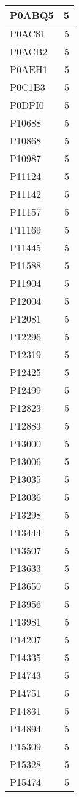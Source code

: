 \documentclass[
]{book}
\theoremstyle{definition}
\theoremstyle{definition}
\theoremstyle{definition}
\theoremstyle{definition}
\theoremstyle{remark}
\begin{document}
\begin{table}
\begin{tabular}{l|r}
\hline
P0ABQ5 & 5\\
\hline
P0AC81 & 5\\
\hline
P0ACB2 & 5\\
\hline
P0AEH1 & 5\\
\hline
P0C1B3 & 5\\
\hline
P0DPI0 & 5\\
\hline
P10688 & 5\\
\hline
P10868 & 5\\
\hline
P10987 & 5\\
\hline
P11124 & 5\\
\hline
P11142 & 5\\
\hline
P11157 & 5\\
\hline
P11169 & 5\\
\hline
P11445 & 5\\
\hline
P11588 & 5\\
\hline
P11904 & 5\\
\hline
P12004 & 5\\
\hline
P12081 & 5\\
\hline
P12296 & 5\\
\hline
P12319 & 5\\
\hline
P12425 & 5\\
\hline
P12499 & 5\\
\hline
P12823 & 5\\
\hline
P12883 & 5\\
\hline
P13000 & 5\\
\hline
P13006 & 5\\
\hline
P13035 & 5\\
\hline
P13036 & 5\\
\hline
P13298 & 5\\
\hline
P13444 & 5\\
\hline
P13507 & 5\\
\hline
P13633 & 5\\
\hline
P13650 & 5\\
\hline
P13956 & 5\\
\hline
P13981 & 5\\
\hline
P14207 & 5\\
\hline
P14335 & 5\\
\hline
P14743 & 5\\
\hline
P14751 & 5\\
\hline
P14831 & 5\\
\hline
P14894 & 5\\
\hline
P15309 & 5\\
\hline
P15328 & 5\\
\hline
P15474 & 5\\

\end{tabular}
\end{table}
\end{document}
